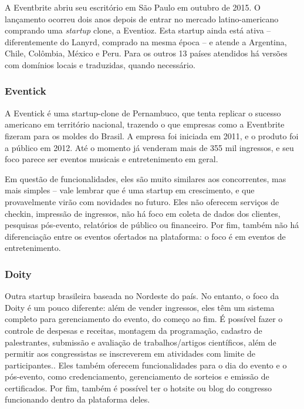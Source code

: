\documentclass[12pt,a4paper,twoside,hyphens,english,brazil]{abntex2}
\begin{document}
A Eventbrite abriu seu escritório em São Paulo em outubro de 2015\cite{eventbrite-sp}. O lançamento ocorreu dois anos depois de entrar no mercado latino-americano comprando uma \emph{startup} clone, a Eventioz\cite{eventbrite-eventioz}. Esta startup ainda está ativa -- diferentemente do Lanyrd, comprado na mesma época -- e atende a Argentina, Chile, Colômbia, México e Peru. Para os outros 13 países atendidos há versões com domínios locais e traduzidas, quando necessário.

\subsubsection*{Eventick}
A Eventick é uma startup-clone de Pernambuco, que tenta replicar o sucesso americano em território nacional, trazendo o que empresas como a Eventbrite fizeram para os moldes do Brasil. A empresa foi iniciada em 2011, e o produto foi a público em 2012.\cite{eventick-startupi} Até o momento já venderam mais de 355 mil ingressos\cite{eventick-home}, e seu foco parece ser eventos musicais e entretenimento em geral.

Em questão de funcionalidades, eles são muito similares aos concorrentes, mas mais simples -- vale lembrar que é uma startup em crescimento, e que provavelmente virão com novidades no futuro. Eles não oferecem serviços de checkin, impressão de ingressos,  não há foco em coleta de dados dos clientes, pesquisas pós-evento, relatórios de público ou financeiro. Por fim, também não há diferenciação entre os eventos ofertados na plataforma: o foco é em eventos de entretenimento.

\subsubsection*{Doity}
Outra startup brasileira baseada no Nordeste do país. No entanto, o foco da Doity é um pouco diferente: além de vender ingressos, eles têm um sistema completo para gerenciamento do evento, do começo ao fim. É possível fazer o controle de despesas e receitas, montagem da programação, cadastro de palestrantes, submissão e avaliação de trabalhos/artigos científicos, além de permitir aos congressistas se inscreverem em atividades com limite de participantes.\cite{doity-como-funciona}. Eles também oferecem funcionalidades para o dia do evento e o pós-evento, como credenciamento, gerenciamento de sorteios e emissão de certificados. Por fim, também é possível ter o hotsite ou blog do congresso funcionando dentro da plataforma deles.
\end{document}
